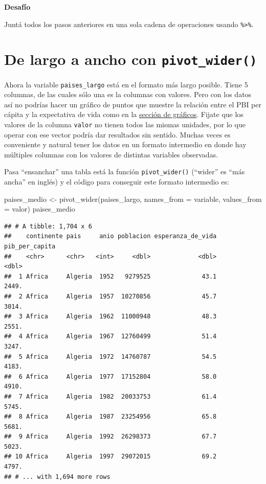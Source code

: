 \documentclass[
  openany]{book}
\newenvironment{Shaded}{\begin{snugshade}}{\end{snugshade}}
\newcommand{\AttributeTok}[1]{\textcolor[rgb]{0.77,0.63,0.00}{#1}}
\newcommand{\FunctionTok}[1]{\textcolor[rgb]{0.00,0.00,0.00}{#1}}
\newcommand{\NormalTok}[1]{#1}
\newcommand{\OtherTok}[1]{\textcolor[rgb]{0.56,0.35,0.01}{#1}}
\begin{document}
\textbf{Desafío}

Juntá todos los pasos anteriores en una sola cadena de operaciones usando \texttt{\%\textgreater{}\%}.

\hypertarget{de-largo-a-ancho-con-pivot_wider-1}{%
\section{\texorpdfstring{De largo a ancho con \texttt{pivot\_wider()}}{De largo a ancho con pivot\_wider()}}\label{de-largo-a-ancho-con-pivot_wider-1}}

Ahora la variable \texttt{paises\_largo} está en el formato más largo posible.
Tiene 5 columnas, de las cuales sólo una es la columnas con valores.
Pero con los datos así no podrías hacer un gráfico de puntos que muestre la relación entre el PBI per cápita y la expectativa de vida como en la \href{06-graficos-I.html\#Segunda_capa:_geometrías}{sección de gráficos}.
Fijate que los valores de la columna \texttt{valor} no tienen todos las mismas unidades, por lo que operar con ese vector podría dar resultados sin sentido.
Muchas veces es conveniente y natural tener los datos en un formato intermedio en donde hay múltiples columnas con los valores de distintas variables observadas.

Pasa ``ensanchar'' una tabla está la función \texttt{pivot\_wider()} (``wider'' es ``más ancha'' en inglés) y el código para conseguir este formato intermedio es:

\begin{Shaded}
\begin{Highlighting}[]
\NormalTok{paises\_medio }\OtherTok{\textless{}{-}} \FunctionTok{pivot\_wider}\NormalTok{(paises\_largo, }\AttributeTok{names\_from =}\NormalTok{ variable, }\AttributeTok{values\_from =}\NormalTok{ valor)}
\NormalTok{paises\_medio}
\end{Highlighting}
\end{Shaded}

\begin{verbatim}
## # A tibble: 1,704 x 6
##    continente pais     anio poblacion esperanza_de_vida pib_per_capita
##    <chr>      <chr>   <int>     <dbl>             <dbl>          <dbl>
##  1 Africa     Algeria  1952   9279525              43.1          2449.
##  2 Africa     Algeria  1957  10270856              45.7          3014.
##  3 Africa     Algeria  1962  11000948              48.3          2551.
##  4 Africa     Algeria  1967  12760499              51.4          3247.
##  5 Africa     Algeria  1972  14760787              54.5          4183.
##  6 Africa     Algeria  1977  17152804              58.0          4910.
##  7 Africa     Algeria  1982  20033753              61.4          5745.
##  8 Africa     Algeria  1987  23254956              65.8          5681.
##  9 Africa     Algeria  1992  26298373              67.7          5023.
## 10 Africa     Algeria  1997  29072015              69.2          4797.
## # ... with 1,694 more rows
\end{verbatim}
\end{document}
